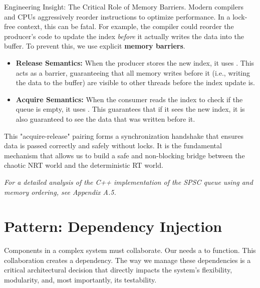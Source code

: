 \begin{principlebox}{Engineering Insight: The Critical Role of Memory Barriers.}
    Modern compilers and CPUs aggressively reorder instructions to optimize performance. In a lock-free context, this can be fatal. For example, the compiler could reorder the producer's code to update the  index \textit{before} it actually writes the data into the buffer. To prevent this, we use explicit \textbf{memory barriers}.
    \begin{itemize}
        \item \textbf{Release Semantics:} When the producer stores the new  index, it uses . This acts as a barrier, guaranteeing that all memory writes before it (i.e., writing the data to the buffer) are visible to other threads before the index update is.
        \item \textbf{Acquire Semantics:} When the consumer reads the  index to check if the queue is empty, it uses . This guarantees that if it sees the new index, it is also guaranteed to see the data that was written before it.
    \end{itemize}
    This "acquire-release" pairing forms a synchronization handshake that ensures data is passed correctly and safely without locks. It is the fundamental mechanism that allows us to build a safe and non-blocking bridge between the chaotic NRT world and the deterministic RT world.
\end{principlebox}

\textit{For a detailed analysis of the C++ implementation of the SPSC queue using  and memory ordering, see Appendix A.5.}





\section{Pattern: Dependency Injection}
\label{sec:pattern_dependency_injection_conceptual}

Components in a complex system must collaborate. Our  needs a  to function. This collaboration creates a dependency. The way we manage these dependencies is a critical architectural decision that directly impacts the system's flexibility, modularity, and, most importantly, its testability.


